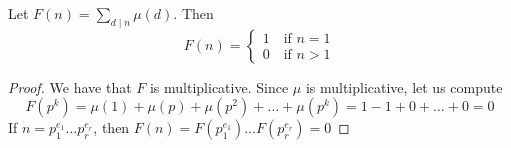     \begin{theorem}
        Let $F(n) = \sum_{d\mid n}^{} \mu(d)$. 
        Then 
        \[
            F(n) = 
            \begin{cases}
                1 \quad\text{if } n = 1 \\
                0 \quad\text{if } n > 1
            \end{cases}    
        \]
        \begin{proof}
            We have that $F$ is multiplicative. Since $\mu$ is multiplicative, let us compute
            \[
                F(p^k) = \mu(1) + \mu(p) + \mu(p^2) + \dots + \mu(p^k) = 1-1+0+\dots+0 = 0
            \]
            If $n = p_1^{e_1}\dots p_r^{e_r}$, then $F(n) = F(p_1^{e_1})\dots F(p_r^{e_r}) = 0$
        \end{proof}
    \end{theorem}


